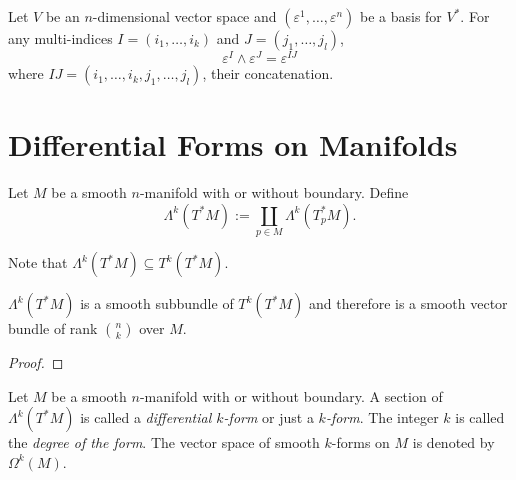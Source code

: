 \begin{proposition}
    Let $V$ be an $n$-dimensional vector space and $(\varepsilon^1,\dots,\varepsilon^n)$ be a basis for $V^*$. For any multi-indices $I = (i_1,\dots,i_k)$ and $J = (j_1,\dots,j_l)$, 
    \begin{equation*}
        \varepsilon^I\wedge\varepsilon^J = \varepsilon^{IJ}
    \end{equation*}
    where $IJ = (i_1,\dots,i_k,j_1,\dots,j_l)$, their concatenation.
\end{proposition}

\section{Differential Forms on Manifolds}

Let $M$ be a smooth $n$-manifold with or without boundary. Define 
\begin{equation*}
    \Lambda^k(T^*M) := \coprod_{p\in M}\Lambda^k(T_p^*M).
\end{equation*}

Note that $\Lambda^k(T^*M)\subseteq T^k(T^*M)$.

\begin{proposition}
    $\Lambda^k(T^*M)$ is a smooth subbundle of $T^k(T^*M)$ and therefore is a smooth vector bundle of rank $\binom{n}{k}$ over $M$.
\end{proposition}
\begin{proof}
\end{proof}

\begin{definition}
    Let $M$ be a smooth $n$-manifold with or without boundary. A section of $\Lambda^k(T^*M)$ is called a \emph{differential $k$-form} or just a \emph{$k$-form}. The integer $k$ is called the \emph{degree of the form}. The vector space of smooth $k$-forms on $M$ is denoted by $\Omega^k(M)$.
\end{definition}
